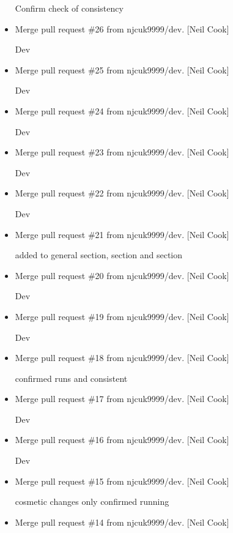 \documentclass[a4paper,10pt,english]{report}
\begin{document}
\begin{itemize}
Confirm check of consistency

\item {} 
Merge pull request \#26 from njcuk9999/dev. {[}Neil Cook{]}

Dev

\item {} 
Merge pull request \#25 from njcuk9999/dev. {[}Neil Cook{]}

Dev

\item {} 
Merge pull request \#24 from njcuk9999/dev. {[}Neil Cook{]}

Dev

\item {} 
Merge pull request \#23 from njcuk9999/dev. {[}Neil Cook{]}

Dev

\item {} 
Merge pull request \#22 from njcuk9999/dev. {[}Neil Cook{]}

Dev

\item {} 
Merge pull request \#21 from njcuk9999/dev. {[}Neil Cook{]}

added to general section,  section and  section

\item {} 
Merge pull request \#20 from njcuk9999/dev. {[}Neil Cook{]}

Dev

\item {} 
Merge pull request \#19 from njcuk9999/dev. {[}Neil Cook{]}

Dev

\item {} 
Merge pull request \#18 from njcuk9999/dev. {[}Neil Cook{]}

confirmed runs and consistent

\item {} 
Merge pull request \#17 from njcuk9999/dev. {[}Neil Cook{]}

Dev

\item {} 
Merge pull request \#16 from njcuk9999/dev. {[}Neil Cook{]}

Dev

\item {} 
Merge pull request \#15 from njcuk9999/dev. {[}Neil Cook{]}

cosmetic changes only \sphinxhyphen{} confirmed running

\item {} 
Merge pull request \#14 from njcuk9999/dev. {[}Neil Cook{]}


\end{itemize}
\end{document}
